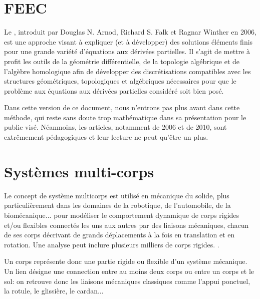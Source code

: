 \medskip{}
\section{FEEC}
Le , introduit par Douglas N. Arnod, Richard S. Falk et Ragnar Winther en 2006, est une approche visant à expliquer (et à développer) des solutions éléments finis pour une grande variété d'équations aux dérivées partielles. Il s'agit de mettre à profit les outils de la géométrie différentielle, de la topologie algébrique et de l'algèbre homologique afin de développer des discrétisations compatibles avec les structures géométriques, topologiques et algébriques nécessaires pour que le problème aux équations aux dérivées partielles considéré soit bien posé.

\medskip
Dans cette version de ce document, nous n'entrons pas plus avant dans cette méthode, qui reste sans doute trop mathématique dans sa présentation pour le public visé. Néanmoins, les articles, notamment de 2006 et de 2010, sont extrêmement pédagogiques et leur lecture ne peut qu'être un plus.





\medskip
\section{Systèmes multi-corps}\label{Sec-MBS}

Le concept de système multicorps est utilisé en mécanique du solide, plus particulièrement dans les domaines de la robotique, de l'automobile, de la biomécanique... pour modéliser le comportement dynamique de corps rigides et/ou flexibles connectés les uns aux autres par des liaisons mécaniques, chacun de ses corps décrivant de grands déplacements à la fois en translation et en rotation. Une analyse peut inclure plusieurs milliers de corps rigides.  .

Un corps représente donc une partie rigide ou flexible d'un système mécanique. Un lien désigne une connection entre au moins deux corps ou entre un corps et le sol: on retrouve donc les liaisons mécaniques classiques comme l'appui ponctuel, la rotule, le glissière, le cardan...

